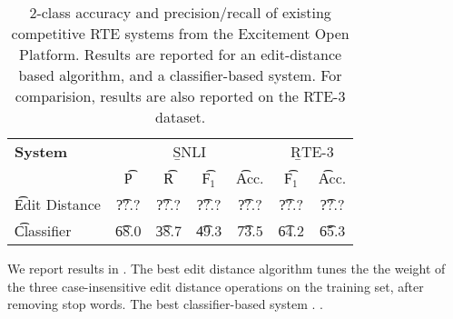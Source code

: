 \begin{table}
\begin{center}
\begin{tabular}{l@{\hskip \colspaceL}c@{\hskip \colspaceS}c@{\hskip \colspaceS}c@{\hskip \colspaceS}c@{\hskip \colspaceL}c@{\hskip \colspaceS}c}
\hline
\textbf{System} & \multicolumn{4}{c}{\b{SNLI}} & \multicolumn{2}{c}{\b{RTE-3}} \\
 & \t{P} & \t{R} & \t{F$_1$} & \t{Acc.} & \t{F$_1$} & \t{Acc.} \\
\hline
\t{Edit Distance} & \t{??.?} & \t{??.?} & \t{??.?} & \t{??.?} & 
                    \t{??.?} & \t{??.?} \\
\t{Classifier}    & \t{68.0} & \t{38.7} & \t{49.3} & \t{73.5} & 
                    \t{64.2} & \t{65.3} \\
\hline
\end{tabular}
\end{center}
\caption{
\label{tab:eopresults}
2-class accuracy and precision/recall of existing competitive RTE
systems from the Excitement Open Platform.
Results are reported for an edit-distance based algorithm, and a
  classifier-based system.
For comparision, results are also reported on the RTE-3 dataset.
}
\end{table}
%
%

We report results in .
The best edit distance algorithm tunes the the weight of the three 
  case-insensitive edit distance operations on the training set, 
  after removing stop words.
The best classifier-based system .
.

%
%
